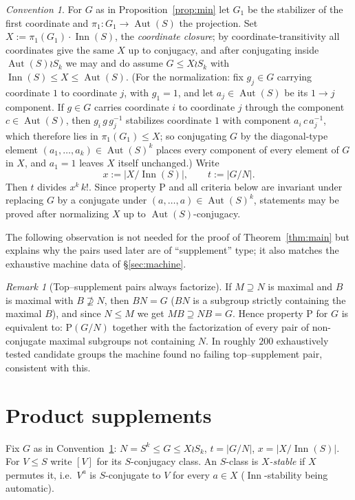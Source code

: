 \documentclass[11pt]{amsart}
\theoremstyle{definition}
\theoremstyle{remark}
\newtheorem{remark}[theorem]{Remark}
\newtheorem{convention}[theorem]{Convention}
\DeclareMathOperator{\Inn}{Inn}
\DeclareMathOperator{\Aut}{Aut}
\begin{document}
\begin{convention}\label{conv:X}
For $G$ as in Proposition~\ref{prop:min} let $G_1$ be the stabilizer of
the first coordinate and $\pi_1\colon G_1\to\Aut(S)$ the projection. Set
$X:=\pi_1(G_1)\cdot\Inn(S)$, the \emph{coordinate closure}; by
coordinate-transitivity all coordinates give the same $X$ up to conjugacy,
and after conjugating inside $\Aut(S)\wr S_k$ we may and do assume
$G\leq X\wr S_k$ with $\Inn(S)\leq X\leq\Aut(S)$. (For the
normalization: fix $g_j\in G$ carrying coordinate $1$ to coordinate $j$,
with $g_1=1$, and let $a_j\in\Aut(S)$ be its $1\!\to\!j$ component. If
$g\in G$ carries coordinate $i$ to coordinate $j$ through the component
$c\in\Aut(S)$, then $g_i\,g\,g_j^{-1}$ stabilizes coordinate $1$ with
component $a_i\,c\,a_j^{-1}$, which therefore lies in
$\pi_1(G_1)\leq X$; so conjugating $G$ by the diagonal-type element
$(a_1,\dots,a_k)\in\Aut(S)^k$ places every component of every element
of $G$ in $X$, and $a_1=1$ leaves $X$ itself unchanged.) Write
\[
x:=|X/\Inn(S)|,\qquad t:=|G/N| .
\]
Then $t$ divides $x^k\,k!$. Since property $\mathrm{P}$ and all criteria
below are invariant under replacing $G$ by a conjugate under
$(a,\dots,a)\in\Aut(S)^k$, statements may be proved after normalizing $X$
up to $\Aut(S)$-conjugacy.
\end{convention}

The following observation is not needed for the proof of
Theorem~\ref{thm:main} but explains why the pairs used later are of
``supplement'' type; it also matches the exhaustive machine data of
\S\ref{sec:machine}.

\begin{remark}[Top--supplement pairs always factorize]
If $M\supseteq N$ is maximal and $B$ is maximal with $B\not\supseteq N$,
then $BN=G$ ($BN$ is a subgroup strictly containing the maximal $B$),
and since $N\leq M$ we get $MB\supseteq NB=G$. Hence property
$\mathrm{P}$ for $G$ is equivalent to: $\mathrm{P}(G/N)$ together with the
factorization of every pair of non-conjugate maximal subgroups not
containing $N$. In roughly $200$ exhaustively tested candidate groups the
machine found no failing top--supplement pair, consistent with this.
\end{remark}

\section{Product supplements}\label{sec:machinery}

Fix $G$ as in Convention~\ref{conv:X}: $N=S^k\leq G\leq X\wr S_k$,
$t=|G/N|$, $x=|X/\Inn(S)|$. For $V\leq S$ write $[V]$ for its
$S$-conjugacy class. An $S$-class is \emph{$X$-stable} if $X$ permutes it,
i.e.\ $V^a$ is $S$-conjugate to $V$ for every $a\in X$ ($\Inn$-stability
being automatic).
\end{document}
